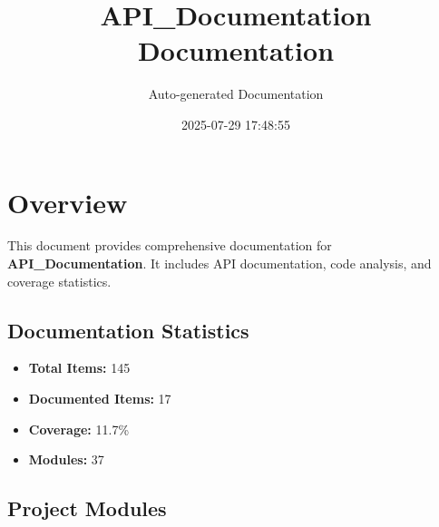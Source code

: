 \documentclass[11pt,a4paper]{article}
\title{API\_Documentation\\Documentation}
\author{Auto-generated Documentation}
\date{2025-07-29 17:48:55}
\begin{document}
\maketitle
\thispagestyle{empty}

\newpage
\tableofcontents
\newpage

\section{Overview}

This document provides comprehensive documentation for \textbf{API\_Documentation}. It includes API documentation, code analysis, and coverage statistics.

\subsection{Documentation Statistics}

\begin{itemize}
    \item \textbf{Total Items:} 145
    \item \textbf{Documented Items:} 17
    \item \textbf{Coverage:} 11.7\%
    \item \textbf{Modules:} 37
\end{itemize}

\subsection{Project Modules}
\end{document}
